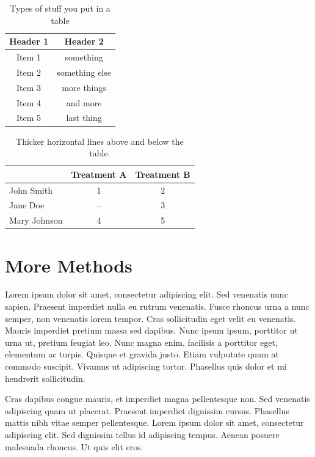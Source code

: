 \documentclass[double,12pt]{beavtex}
\begin{document}
\begin{table}[ht]
\caption{Types of stuff you put in a table} %
\centering  %
\begin{tabular}{c c} %
\hline\hline                        %
Header 1 & Header 2 \\ [0.5ex] %
\hline                  %
Item 1 & something  \\ %
Item 2 & something else  \\
Item 3 & more things  \\
Item 4 & and more \\
Item 5 & last thing \\ [1ex]      %
\hline %
\end{tabular}
\label{table:misc} %
\end{table}


\begin{table}[ht]
\centering
\caption{Thicker horizontal lines above and below the table.}
\begin{tabular}[t]{lcc}
\toprule
&Treatment A&Treatment B\\
\midrule
John Smith&1&2\\
Jane Doe&--&3\\
Mary Johnson&4&5\\
\bottomrule
\end{tabular}
\end{table}%


\section{More Methods}

Lorem ipsum dolor sit amet, consectetur adipiscing elit. Sed venenatis nunc sapien. Praesent imperdiet nulla eu rutrum venenatis. Fusce rhoncus urna a nunc semper, non venenatis lorem tempor. Cras sollicitudin eget velit eu venenatis. Mauris imperdiet pretium massa sed dapibus. Nunc ipsum ipsum, porttitor ut urna ut, pretium feugiat leo. Nunc magna enim, facilisis a porttitor eget, elementum ac turpis. Quisque et gravida justo. Etiam vulputate quam at commodo suscipit. Vivamus ut adipiscing tortor. Phasellus quis dolor et mi hendrerit sollicitudin. 

Cras dapibus congue mauris, et imperdiet magna pellentesque non. Sed venenatis adipiscing quam ut placerat. Praesent imperdiet dignissim cursus. Phasellus mattis nibh vitae semper pellentesque. Lorem ipsum dolor sit amet, consectetur adipiscing elit. Sed dignissim tellus id adipiscing tempus. Aenean posuere malesuada rhoncus. Ut quis elit eros.
\end{document}
